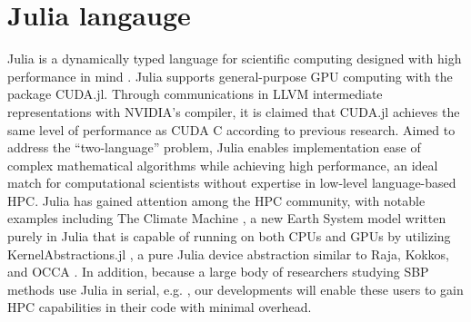 \section{Julia langauge}

Julia is a dynamically typed language for scientific computing designed with high performance in mind \citep{bezanson2017julia}.
 Julia supports general-purpose GPU computing with the package CUDA.jl. Through communications in LLVM intermediate representations with NVIDIA's compiler, it is claimed that CUDA.jl achieves the same level of performance as CUDA C according to previous research\citep{besard2018effective}.
Aimed to address the ``two-language'' problem, Julia enables implementation ease of complex mathematical algorithms while achieving high performance, an ideal match for computational scientists without expertise in low-level language-based HPC. Julia has gained attention among the HPC community, with notable examples including The Climate Machine \citep{clima}, a new Earth System model written purely in Julia that is capable of running on both CPUs and GPUs by utilizing KernelAbstractions.jl \citep{valentin_churavy_2024_10780635}, a pure Julia device abstraction similar to Raja, Kokkos, and OCCA \citep{8945721, CARTEREDWARDS20143202, Medina}. In addition, because a large body of researchers studying SBP methods use Julia in serial, e.g. \citep{Kozdon2020HybridizedSF,ranocha2021new}, our developments will enable these users to gain HPC capabilities in their code with minimal overhead.
